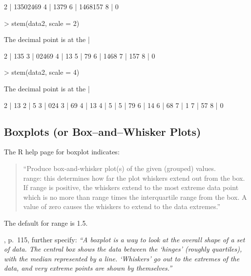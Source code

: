 \begin{Schunk}
\begin{Soutput}
  2 | 13502469
  4 | 1379
  6 | 1468157
  8 | 0
\end{Soutput}
\begin{Sinput}
> stem(data2, scale = 2)
\end{Sinput}
\begin{Soutput}
  The decimal point is at the |

  2 | 135
  3 | 02469
  4 | 13
  5 | 79
  6 | 1468
  7 | 157
  8 | 0
\end{Soutput}
\begin{Sinput}
> stem(data2, scale = 4)
\end{Sinput}
\begin{Soutput}
  The decimal point is at the |

  2 | 13
  2 | 5
  3 | 024
  3 | 69
  4 | 13
  4 | 
  5 | 
  5 | 79
  6 | 14
  6 | 68
  7 | 1
  7 | 57
  8 | 0
\end{Soutput}
\end{Schunk}


\newpage


\subsection{Boxplots (or Box--and--Whisker Plots)}


The R help page for boxplot indicates:
\begin{quotation}
``Produce box-and-whisker plot(s) of the given (grouped) values. \\[0.2cm]
range: this determines how far the plot whiskers extend out from the box. 
If range is positive, the whiskers extend to the most extreme data point which 
is no more than range times the interquartile range from the box. 
A value of zero causes the whiskers to extend to the data extremes.''
\end{quotation}

The default for range is 1.5.


\cite{VR2002}, p.~115, further specify: 
{\it ``A boxplot is a way to look at the overall shape of a set of data.
The central box shows the data between the `hinges' (roughly quartiles),
with the median represented by a line. `Whiskers' go out to the extremes
of the data, and very extreme points are shown by themselves.''}


